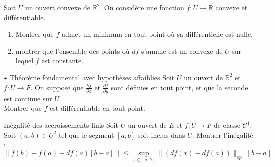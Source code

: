 \documentclass[french,a4paper]{article}
\newcommand{\R}{\mathbb{R}}
\theoremstyle{plain}
\theoremstyle{definition}
\theoremstyle{remark}
\begin{document}
\begin{ex}[Moulin.14]{}
	Soit $U$ un ouvert convexe de $\R^2$. On considère une fonction $f:U\to\R$ convexe et différentiable.
	\begin{enumerate}
		\item Montrer que $f$ admet un minimum en tout point où sa différentielle est nulle.
		\item montrer que l'ensemble des points où $df$ s'annule est un convexe de $U$ sur lequel $f$ est constante.
	\end{enumerate}
\end{ex}

\begin{ex}[Moulin.15]{$\star$ Théorème fondamental avec hypothèses affaiblies}
	Soit $U$ un ouvert de $\R^2$ et $f:U\to F$. On suppose que $\displaystyle\frac{\partial f}{\partial x}$ et $\displaystyle\frac{\partial f}{\partial y}$ sont définies en tout point, et que la seconde est continue sur $U$. \\ Montrer que $f$ est différentiable en tout point.
\end{ex}

\begin{ex}[Moulin.16]{Inégalité des accroissements finis}
	Soit $U$ un ouvert de $E$ et $f:U\to F$ de classe $\mathcal{C}^1$. Soit $(a,b)\in U^2$ tel que le segment $[a,b]$ soit inclus dans $U$. Montrer l'inégalité : $$\lVert f(b)-f(a)-df(a)[b-a]\rVert\leqslant\underset{x\in[a,b]}{\sup}\lVert(df(x)-df(a))\rVert_{op}\lVert b-a\rVert$$
\end{ex}
\end{document}
